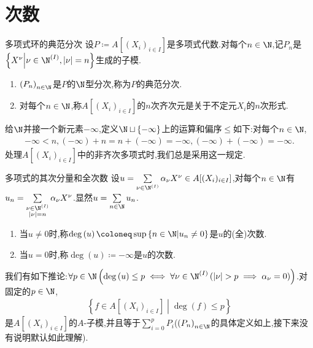 \section{次数}

\begin{definition}{多项式环的典范分次}{}
	设$P\coloneq A[(X_{i})_{i\in I}]$是多项式代数.对每个$n\in\N$,记$P_{n}$是$\left\{X^{\nu}\middle|\nu\in\N^{\left(I\right)},\left|\nu\right|=n\right\}$生成的子模.
	\begin{enumerate}
		\item $\left(P_{n}\right)_{n\in\N}$是$P$的$\N$型分次,称为$P$的典范分次.
		\item 对每个$n\in\N$,称$A[(X_{i})_{i\in I}]$的$n$次齐次元是关于不定元$X_{i}$的$n$次形式.
	\end{enumerate}
\end{definition}

\begin{remark}{}{}
	给$\N$并接一个新元素$-\infty$,定义$\N\sqcup\left\{-\infty\right\}$上的运算和偏序$\leq$如下:对每个$n\in\N$,
	\begin{align*}
		-\infty<n,\left(-\infty\right)+n=n+\left(-\infty\right)=-\infty,\left(-\infty\right)+\left(-\infty\right)=-\infty.
	\end{align*}
	处理$A[(X_{i})_{i\in I}]$中的非齐次多项式时,我们总是采用这一规定.
\end{remark}

\begin{definition}{多项式的其次分量和全次数}{}
	设$u=\sum\limits_{\nu\in\N^{\left(I\right)}}\alpha_{\nu}X^{\nu}\in A[(X_{i})_{i\in I}]$,对每个$n\in\N$有$u_{n}=\sum\limits_{\substack{\nu\in\N^{\left(I\right)}\\ \left|\nu\right|=n}}\alpha_{\nu}X^{\nu}$.显然$u=\sum\limits_{n\in\N}u_{n}$.
	\begin{enumerate}
		\item 当$u\neq 0$时,称$\deg\left(u\right)\coloneq\sup\left\{n\in\N\middle|u_{n}\neq 0\right\}$是$u$的(全)次数.
		\item 当$u=0$时,称$\deg\left(u\right)\coloneq -\infty$是$u$的次数.
	\end{enumerate}
\end{definition}

\begin{remark}{}{}
	我们有如下推论:$\forall p\in\N\left(\deg\left(u\right)\leq p\iff\forall\nu\in\N^{\left(I\right)}\left(\left|\nu\right|>p\implies\alpha_{\nu}=0\right)\right)$.对固定的$p\in\N$,
	\begin{align*}
		\left\{f\in A[(X_{i})_{i\in I}]\middle|\deg\left(f\right)\leq p\right\}
	\end{align*}
	是$A[(X_{i})_{i\in I}]$的$A$-子模,并且等于$\sum\limits_{i=0}^{p}P_{i}$($\left(P_{n}\right)_{n\in\N}$的具体定义如上,接下来没有说明默认如此理解).
\end{remark}

